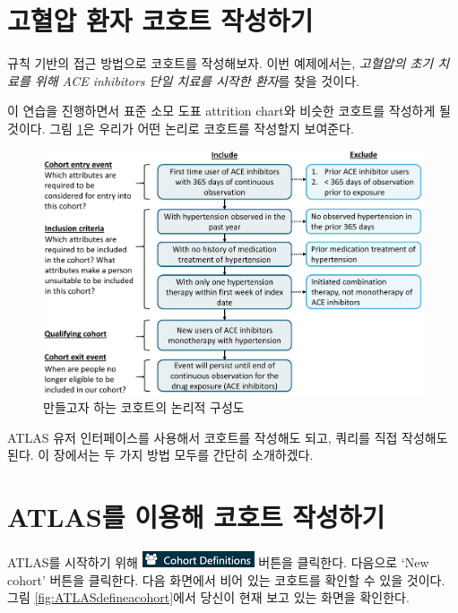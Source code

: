 \documentclass[10.5pt]{book}
\theoremstyle{definition}
\theoremstyle{definition}
\theoremstyle{definition}
\theoremstyle{remark}
\begin{document}
\section{고혈압 환자 코호트 작성하기}\label{---}

규칙 기반의 접근 방법으로 코호트를 작성해보자. 이번 예제에서는,
\emph{고혈압의 초기 치료를 위해 ACE inhibitors 단일 치료를 시작한
환자}를 찾을 것이다.

이 연습을 진행하면서 표준 소모 도표 attrition chart와 비슷한 코호트를
작성하게 될 것이다. 그림 \ref{fig:CohortPractice}은 우리가 어떤 논리로
코호트를 작성할지 보여준다.

\begin{figure}

{\centering \includegraphics[width=1\linewidth]{images/Cohorts/CohortPractice} 

}

\caption{만들고자 하는 코호트의 논리적 구성도}\label{fig:CohortPractice}
\end{figure}

ATLAS 유저 인터페이스를 사용해서 코호트를 작성해도 되고, 쿼리를 직접
작성해도 된다. 이 장에서는 두 가지 방법 모두를 간단히 소개하겠다.

\section{ATLAS를 이용해 코호트 작성하기}\label{atlas---}

ATLAS를 시작하기 위해
\includegraphics{images/Cohorts/cohortdefinition.png} 버튼을 클릭한다.
다음으로 `New cohort' 버튼을 클릭한다. 다음 화면에서 비어 있는 코호트를
확인할 수 있을 것이다. 그림 \ref{fig:ATLASdefineacohort}에서 당신이 현재
보고 있는 화면을 확인한다.
\end{document}

